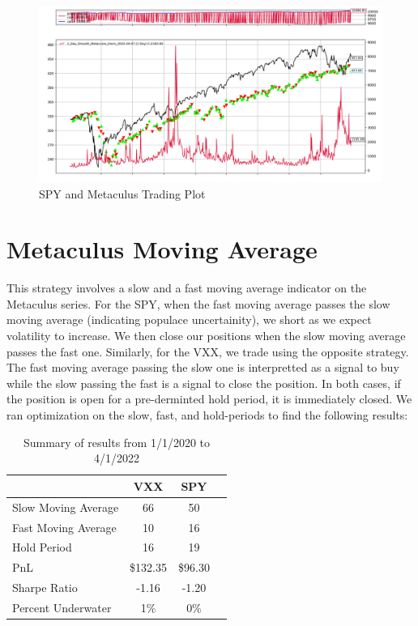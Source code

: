 \documentclass{article}
\begin{document}
\begin{figure}[H]
    \centering
    \includegraphics[width=\textwidth]{Metaculus_Momentum_SPY.png}
    \caption{SPY and Metaculus Trading Plot}
\end{figure}

\newpage

\section*{Metaculus Moving Average}
This strategy involves a slow and a fast moving average indicator on the Metaculus series. For the SPY, when the fast moving average passes the slow moving average (indicating populace uncertainity), we short as we expect volatility to increase. We then close our positions when the slow moving average passes the fast one.
Similarly, for the VXX, we trade using the opposite strategy. The fast moving average passing the slow one is interpretted as a signal to buy while the slow passing the fast is a signal to close the position. In both cases, if the position is open for a pre-derminted hold period, it is immediately closed. We ran optimization on the slow, fast, and hold-periods to find the following results:

\begin{table}[h]
    \centering
    
    \begin{tabular}{l||ccc}
        \toprule
         & \textbf{VXX} & \textbf{SPY} & \\
        \midrule
        Slow Moving Average & 66  & 50\\
        Fast Moving Average & 10  & 16\\
        Hold Period & 16  & 19\\
        PnL & \$132.35 & \$96.30 \\
        Sharpe Ratio & -1.16 & -1.20\\
        Percent Underwater & 1\% &  0\%\\
        \bottomrule
    \end{tabular}
    \caption{Summary of results from 1/1/2020 to 4/1/2022}
    \end{table}
\end{document}
